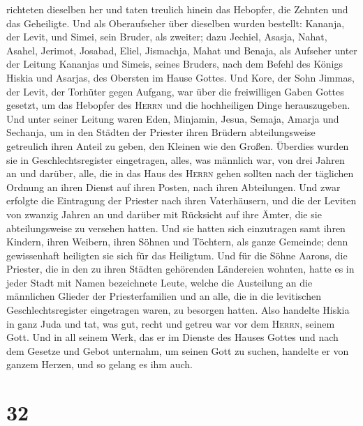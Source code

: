 richteten dieselben her  und taten treulich hinein das
Hebopfer, die Zehnten und das Geheiligte. Und als Oberaufseher über
dieselben wurden bestellt: Kananja, der Levit, und Simei, sein Bruder,
als zweiter;  dazu Jechiel, Asasja, Nahat, Asahel,
Jerimot, Josabad, Eliel, Jismachja, Mahat und Benaja, als Aufseher unter
der Leitung Kananjas und Simeis, seines Bruders, nach dem Befehl des
Königs Hiskia und Asarjas, des Obersten im Hause Gottes. 
Und Kore, der Sohn Jimmas, der Levit, der Torhüter gegen Aufgang, war
über die freiwilligen Gaben Gottes gesetzt, um das Hebopfer des
\textsc{Herrn} und die hochheiligen Dinge herauszugeben. 
Und unter seiner Leitung waren Eden, Minjamin, Jesua, Semaja, Amarja und
Sechanja, um in den Städten der Priester ihren Brüdern abteilungsweise
getreulich ihren Anteil zu geben, den Kleinen wie den Großen.
 Überdies wurden sie in Geschlechtsregister eingetragen,
alles, was männlich war, von drei Jahren an und darüber, alle, die in
das Haus des \textsc{Herrn} gehen sollten nach der täglichen Ordnung an
ihren Dienst auf ihren Posten, nach ihren Abteilungen. 
Und zwar erfolgte die Eintragung der Priester nach ihren Vaterhäusern,
und die der Leviten von zwanzig Jahren an und darüber mit Rücksicht auf
ihre Ämter, die sie abteilungsweise zu versehen hatten. 
Und sie hatten sich einzutragen samt ihren Kindern, ihren Weibern, ihren
Söhnen und Töchtern, als ganze Gemeinde; denn gewissenhaft heiligten sie
sich für das Heiligtum.  Und für die Söhne Aarons, die
Priester, die in den zu ihren Städten gehörenden Ländereien wohnten,
hatte es in jeder Stadt mit Namen bezeichnete Leute, welche die
Austeilung an die männlichen Glieder der Priesterfamilien und an alle,
die in die levitischen Geschlechtsregister eingetragen waren, zu
besorgen hatten.  Also handelte Hiskia in ganz Juda und
tat, was gut, recht und getreu war vor dem \textsc{Herrn}, seinem Gott.
 Und in all seinem Werk, das er im Dienste des Hauses
Gottes und nach dem Gesetze und Gebot unternahm, um seinen Gott zu
suchen, handelte er von ganzem Herzen, und so gelang es ihm auch.

\hypertarget{section-31}{%
\section{32}\label{section-31}}

